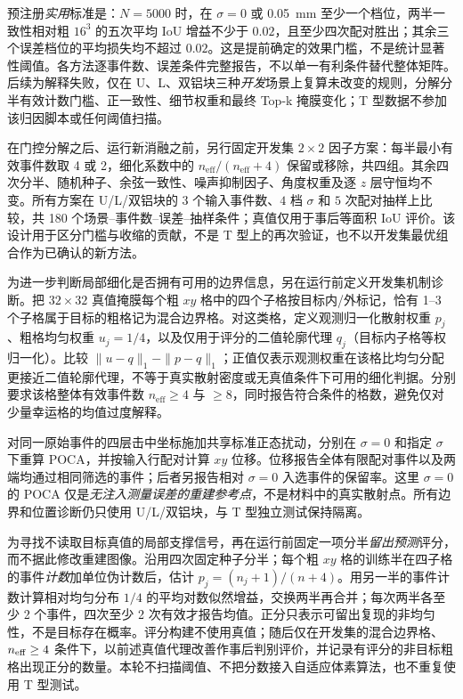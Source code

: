 \documentclass[UTF8,fontset=none,zihao=-4,a4paper]{ctexart}
\begin{document}
预注册\emph{实用}标准是：$N=5000$ 时，在 $\sigma=0$ 或 \SI{0.05}{mm} 至少一个档位，两半一致性相对粗 $16^3$ 的五次平均 IoU 增益不少于 $0.02$，且至少四次配对胜出；其余三个误差档位的平均损失均不超过 $0.02$。这是提前确定的效果门槛，不是统计显著性阈值。各方法逐事件数、误差条件完整报告，不以单一有利条件替代整体矩阵。后续为解释失败，仅在 U、L、双铝块三种\emph{开发}场景上复算未改变的规则，分解分半有效计数门槛、正一致性、细节权重和最终 Top-k 掩膜变化；T 型数据不参加该归因脚本或任何阈值扫描。

在门控分解之后、运行新消融之前，另行固定开发集 $2\times2$ 因子方案：每半最小有效事件数取 4 或 2，细化系数中的 $n_{\mathrm{eff}}/(n_{\mathrm{eff}}+4)$ 保留或移除，共四组。其余四次分半、随机种子、余弦一致性、噪声抑制因子、角度权重及逐 $z$ 层守恒均不变。所有方案在 U/L/双铝块的 $3$ 个输入事件数、$4$ 档 $\sigma$ 和 $5$ 次配对抽样上比较，共 180 个场景--事件数--误差--抽样条件；真值仅用于事后等面积 IoU 评价。该设计用于区分门槛与收缩的贡献，不是 T 型上的再次验证，也不以开发集最优组合作为已确认的新方法。

为进一步判断局部细化是否拥有可用的边界信息，另在运行前定义开发集机制诊断。把 $32\times32$ 真值掩膜每个粗 $xy$ 格中的四个子格按目标内/外标记，恰有 1--3 个子格属于目标的粗格记为混合边界格。对这类格，定义观测归一化散射权重 $p_j$、粗格均匀权重 $u_j=1/4$，以及仅用于评分的二值轮廓代理 $q_j$（目标内子格等权归一化）。比较 $\|u-q\|_1-\|p-q\|_1$；正值仅表示观测权重在该格比均匀分配更接近二值轮廓代理，不等于真实散射密度或无真值条件下可用的细化判据。分别要求该格整体有效事件数 $n_{\mathrm{eff}}\geq4$ 与 $\geq8$，同时报告符合条件的格数，避免仅对少量幸运格的均值过度解释。

对同一原始事件的四层击中坐标施加共享标准正态扰动，分别在 $\sigma=0$ 和指定 $\sigma$ 下重算 POCA，并按输入行配对计算 $xy$ 位移。位移报告全体有限配对事件以及两端均通过相同筛选的事件；后者另报告相对 $\sigma=0$ 入选事件的保留率。这里 $\sigma=0$ 的 POCA 仅是\emph{无注入测量误差的重建参考点}，不是材料中的真实散射点。所有边界和位置诊断仍只使用 U/L/双铝块，与 T 型独立测试保持隔离。

为寻找不读取目标真值的局部支撑信号，再在运行前固定一项分半\emph{留出预测}评分，而不据此修改重建图像。沿用四次固定种子分半；每个粗 $xy$ 格的训练半在四子格的事件\emph{计数}加单位伪计数后，估计 $p_j=(n_j+1)/(n+4)$。用另一半的事件计数计算相对均匀分布 $1/4$ 的平均对数似然增益，交换两半再合并；每次两半各至少 2 个事件，四次至少 2 次有效才报告均值。正分只表示可留出复现的非均匀性，不是目标存在概率。评分构建不使用真值；随后仅在开发集的混合边界格、$n_{\rm eff}\geq4$ 条件下，以前述真值代理改善作事后判别评价，并记录有评分的非目标粗格出现正分的数量。本轮不扫描阈值、不把分数接入自适应体素算法，也不重复使用 T 型测试。
\end{document}
